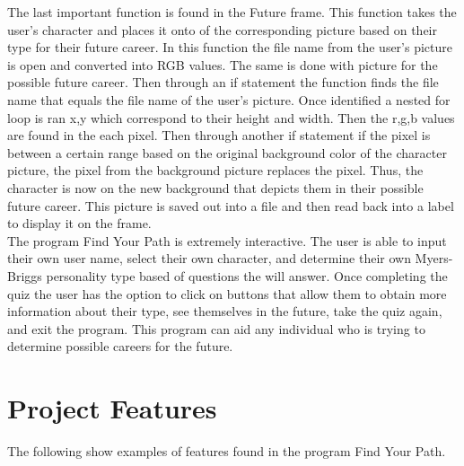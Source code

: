 \documentclass[11pt]{article}%
\begin{document}
\indent The last important function is found in the Future frame. This function takes the user’s character and places it onto of the corresponding picture based on their type for their future career. In this function the file name from the user’s picture is open and converted into RGB values. The same is done with picture for the possible future career. Then through an if statement the function finds the file name that equals the file name of the user’s picture. Once identified a nested for loop is ran x,y which correspond to their height and width. Then the r,g,b values are found in the each pixel. Then through another if statement if the pixel is between a certain range based on the original background color of the character picture, the pixel from the background picture replaces the pixel. Thus, the character is now on the new background that depicts them in their possible future career. This picture is saved out into a file and then read back into a label to display it on the frame.\\
\indent The program Find Your Path is extremely interactive. The user is able to input their own user name, select their own character, and determine their own Myers-Briggs personality type based of questions the will answer. Once completing the quiz the user has the option to click on buttons that allow them to obtain more information about their type, see themselves in the future, take the quiz again, and exit the program. This program can aid any individual who is trying to determine possible careers for the future.
 
\section*{Project Features}
The following show examples of features found in the program Find Your Path.
\end{document}

